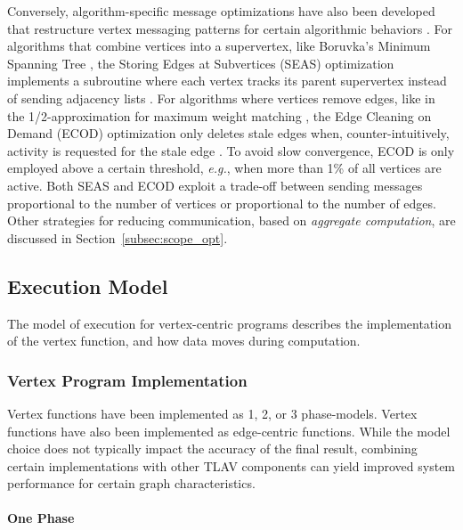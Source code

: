 \documentclass[reprint,twocolumn,showpacs,preprintnumbers,amsmath, aps,pre,amssymb]{revtex4-1}
\begin{document}
Conversely, algorithm-specific message optimizations have also been developed that restructure vertex messaging patterns for certain algorithmic behaviors \cite{Salihoglu2014,Quick2012}.  For algorithms that combine vertices into a supervertex, like Boruvka's Minimum Spanning Tree \cite{Chung1996}, the Storing Edges at Subvertices (SEAS) optimization implements a subroutine where each vertex tracks its parent supervertex instead of sending adjacency lists \cite{Salihoglu2014}.  For algorithms where vertices remove edges, like in the 1/2-approximation for maximum weight matching \cite{Preis1999}, the Edge Cleaning on Demand (ECOD) optimization only deletes stale edges when, counter-intuitively, activity is requested for the stale edge \cite{Salihoglu2014}.  To avoid slow convergence, ECOD is only employed above a certain threshold, {\em e.g.}, when more than 1\% of all vertices are active.  Both SEAS and ECOD exploit a trade-off between sending messages proportional to the number of vertices or proportional to the number of edges.  Other strategies for reducing communication, based on {\em aggregate computation}, are discussed in Section~\ref{subsec:scope_opt}. 

\subsection{Execution Model}
\label{subsec:comp_models}

The model of execution for vertex-centric programs describes the implementation of the vertex function, and how data moves during computation.  

\subsubsection{Vertex Program Implementation}

Vertex functions have been implemented as 1, 2, or 3 phase-models.  Vertex functions have also been implemented as edge-centric functions.  While the model choice does not typically impact the accuracy of the final result, combining certain implementations with other TLAV components can yield improved system performance for certain graph characteristics.

\paragraph{One Phase}  
\end{document}
